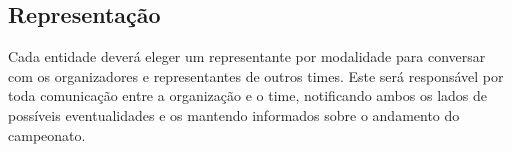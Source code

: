 \subsection{Representação}

Cada entidade deverá eleger um representante por modalidade para conversar com os organizadores e representantes de outros times. Este será responsável por toda comunicação entre a organização e o time, notificando ambos os lados de possíveis eventualidades e os mantendo informados sobre o andamento do campeonato.
